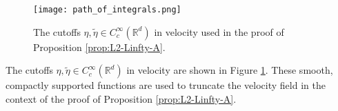 \documentclass{article}
\newcommand{\R}{\mathbb{R}}
\newcommand{\cutoff}{C_c^\infty}
\begin{document}
\begin{figure}[h]
    \centering
    \texttt{[image: path\_of\_integrals.png]} %
    \caption{The cutoffs $\eta, \tilde{\eta} \in \cutoff(\R^d)$ in velocity used in the proof of Proposition \ref{prop:L2-Linfty-A}.}
    \label{fig:path_of_integrals}
\end{figure}

The cutoffs $\eta, \tilde{\eta} \in \cutoff(\R^d)$ in velocity are shown in Figure \ref{fig:path_of_integrals}. These smooth, compactly supported functions are used to truncate the velocity field in the context of the proof of Proposition \ref{prop:L2-Linfty-A}. 
\end{document}
